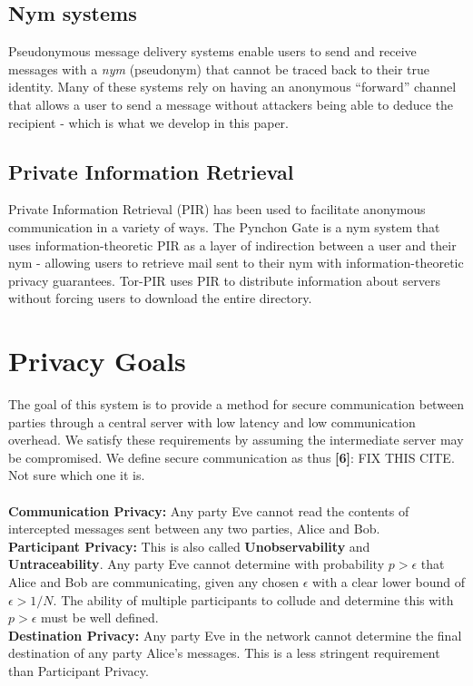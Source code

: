 \documentclass[twocolumn,11pt,english]{article}
\begin{document}
\subsection{Nym systems} Pseudonymous message delivery systems enable users to send and receive messages with a \textit{nym} (pseudonym) that cannot be traced back to their true identity. Many of these systems rely on having an anonymous ``forward'' channel that allows a user to send a message without attackers being able to deduce the recipient - which is what we develop in this paper. 

\subsection{Private Information Retrieval} Private Information Retrieval (PIR) has been used to facilitate anonymous communication in a variety of ways. The Pynchon Gate \cite{sassaman:wpes2005} is a nym system that uses information-theoretic PIR as a layer of indirection between a user and their nym - allowing users to retrieve mail sent to their nym with information-theoretic privacy guarantees. Tor-PIR \cite{MittalOTBG11} uses PIR to distribute information about servers without forcing users to download the entire directory. 

\section{Privacy Goals}
The goal of this system is to provide a method for secure communication between parties through a central server with low latency and low communication overhead. We satisfy these requirements by assuming the intermediate server may be compromised. We define secure communication as thus \textbf{[6]}: FIX THIS CITE. Not sure which one it is.
\\\\\textbf{Communication Privacy:} Any party Eve cannot read the contents of intercepted messages sent between any two parties, Alice and Bob. 
\\\textbf{Participant Privacy:} This is also called \textbf{Unobservability} and \textbf{Untraceability}. Any party Eve cannot determine with probability $p > \epsilon$ that Alice and Bob are communicating, given any chosen $\epsilon$ with a clear lower bound of $\epsilon > 1/N$. The ability of multiple participants to collude and determine this with $p > \epsilon$ must be well defined.
\\\textbf{Destination Privacy:} Any party Eve in the network cannot determine the final destination of any party Alice's messages. This is a less stringent requirement than Participant Privacy.
\end{document}
